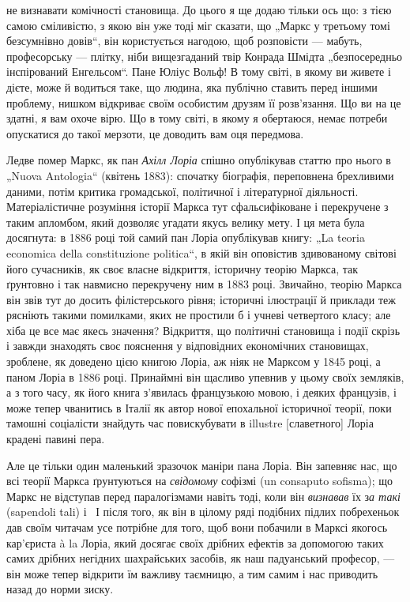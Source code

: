 \parcont{}  %
не визнавати комічності становища. До цього я ще додаю тільки
ось що: з тією самою сміливістю, з якою він уже тоді міг сказати,
що „Маркс у третьому томі безсумнівно довів“, він користується
нагодою, щоб розповісти — мабуть, професорську —
плітку, ніби вищезгаданий твір Конрада Шмідта „безпосередньо
інспірований Енгельсом“. Пане Юліус Вольф! В тому світі, в якому
ви живете і дієте, може й водиться таке, що людина, яка публічно
ставить перед іншими проблему, нишком відкриває своїм
особистим друзям її розв’язання. Що ви на це здатні, я вам охоче
вірю. Що в тому світі, в якому я обертаюся, немає потреби
опускатися до такої мерзоти, це доводить вам оця передмова.

Ледве помер Маркс, як пан \emph{Ахілл Лоріа} спішно опублікував
статтю про нього в „Nuova Antologia“ (квітень 1883): спочатку
біографія, переповнена брехливими даними, потім критика
громадської, політичної і літературної діяльності. Матеріалістичне
розуміння історії Маркса тут сфальсифіковане і перекручене
з таким апломбом, який дозволяє угадати якусь велику
мету. І ця мета була досягнута: в 1886 році той самий пан
Лоріа опублікував книгу: „La teoria economica della constituzione
politica“, в якій він оповістив здивованому світові його сучасників,
як своє власне відкриття, історичну теорію Маркса, так
ґрунтовно і так навмисно перекручену ним в 1883 році. Звичайно,
теорію Маркса він звів тут до досить філістерського
рівня; історичні ілюстрації й приклади теж рясніють такими помилками,
яких не простили б і учневі четвертого класу; але
хіба це все має якесь значення? Відкриття, що політичні становища
і події скрізь і завжди знаходять своє пояснення у відповідних
економічних становищах, зроблене, як доведено цією книгою
Лоріа, аж ніяк не Марксом у 1845 році, а паном Лоріа
в 1886 році. Принаймні він щасливо упевнив у цьому своїх земляків,
а з того часу, як його книга з’явилась французькою мовою,
і деяких французів, і може тепер чванитись в Італії як
автор нової епохальної історичної теорії, поки тамошні соціалісти
знайдуть час повискубувати в illustre [славетного] Лоріа
крадені павині пера.

Але це тільки один маленький зразочок маніри пана Лоріа.
Він запевняє нас, що всі теорії Маркса ґрунтуються на \emph{свідомому}
софізмі (un consaputo sofisma); що Маркс не відступав
перед паралогізмами навіть тоді, коли він \emph{визнавав} їх з\emph{а такі}
(sapendoli tali) і~ І після того, як він в цілому ряді подібних
підлих побрехеньок дав своїм читачам усе потрібне для
того, щоб вони побачили в Марксі якогось кар’єриста à la Лоріа,
який досягає своїх дрібних ефектів за допомогою таких самих
дрібних негідних шахрайських засобів, як наш падуанський професор,
— він може тепер відкрити їм важливу таємницю, а тим
самим і нас приводить назад до норми зиску.

